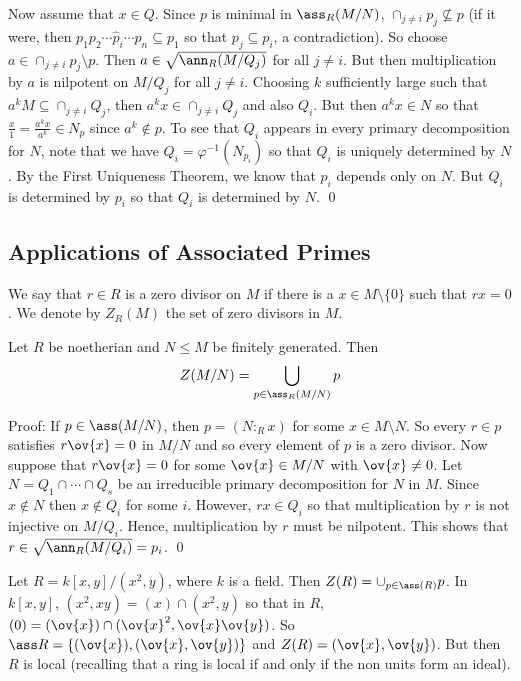 Now assume that $x \in Q$. Since $p$ is minimal in $\ass_R(M/N)$, $\cap_{j \neq i} p_j \not\subseteq p$ (if it were, then $p_1p_2\cdots \hat{p}_i \cdots p_n \subseteq p_1$ so that $p_j \subseteq p_i$, a contradiction). So choose $a \in \cap_{j \neq i} p_j \setminus p$. Then $a \in \sqrt{\ann_R(M/Q_j)}$ for all $j \neq i$. But then multiplication by $a$ is nilpotent on $M/Q_j$ for all $j \neq i$. Choosing $k$ sufficiently large such that $a^kM \subseteq \cap_{j \neq i} Q_j$, then $a^kx \in \cap_{j \neq i} Q_j$ and also $Q_i$. But then $a^kx \in N$ so that $\frac{x}{1}=\frac{a^kx}{a^k} \in N_p$ since $a^k \notin p$. To see that $Q_i$ appears in every primary decomposition for $N$, note that we have $Q_i=\varphi^{-1}(N_{p_i})$ so that $Q_i$ is uniquely determined by $N$. By the First Uniqueness Theorem, we know that $p_i$ depends only on $N$. But $Q_i$ is determined by $p_i$ so that $Q_i$ is determined by $N$. \qed \\

\subsection{Applications of Associated Primes}

\begin{dfn}[Zerodivisor]
We say that $r \in R$ is a zero divisor on $M$ if there is a $x \in M\setminus \{0\}$ such that $rx=0$. We denote by $Z_R(M)$ the set of zero divisors in $M$. 
\end{dfn}

\begin{prop}
Let $R$ be noetherian and $N \leq M$ be finitely generated. Then
\[
Z(M/N)=\bigcup_{p \in \ass_R(M/N)} p
\]
\end{prop}

\noindent Proof: If $p \in \ass(M/N)$, then $p=(N:_R x)$ for some $x \in M \setminus N$. So every $r \in p$ satisfies $r \ov{x}=0$ in $M/N$ and so every element of $p$ is a zero divisor. Now suppose that $r \ov{x}=0$ for some $\ov{x} \in M/N$ with $\ov{x} \neq 0$. Let $N=Q_1 \cap \cdots \cap Q_s$ be an irreducible primary decomposition for $N$ in $M$. Since $x \notin N$ then $x \notin Q_i$ for some $i$. However, $rx \in Q_i$ so that multiplication by $r$ is not injective on $M/Q_i$. Hence, multiplication by $r$ must be nilpotent. This shows that $r \in \sqrt{\ann_R(M/Q_i)}=p_i$. \qed \\

\begin{ex}
Let $R=k[x,y]/(x^2,y)$, where $k$ is a field. Then $Z(R)=\cup_{p \in \ass(R)} p$. In $k[x,y]$, $(x^2,xy)=(x) \cap (x^2,y)$ so that in $R$, $(0)=(\ov{x}) \cap (\ov{x}^2,\ov{x}\ov{y})$. So $\ass R=\{(\ov{x}),(\ov{x},\ov{y})\}$ and $Z(R)=(\ov{x},\ov{y})$. But then $R$ is local (recalling that a ring is local if and only if the non units form an ideal).
\end{ex}


